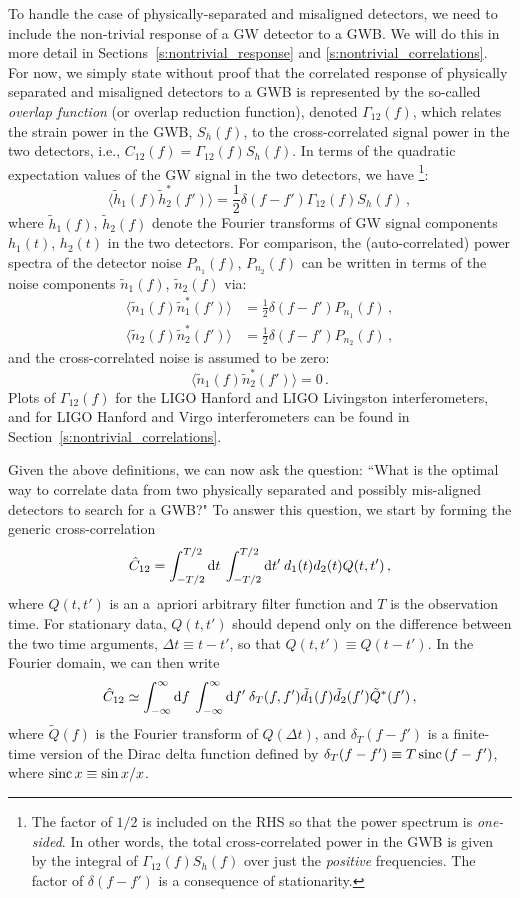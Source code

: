 \documentclass[11pt]{article}
\numberwithin{equation}{section}
\def\be{\begin{equation}}
\def\ee{\end{equation}}
\def\D{{\rm d}}
\begin{document}
To handle the case of physically-separated and misaligned 
detectors, we need to include the non-trivial response of 
a GW detector to a GWB.  
We will do this in more detail in 
Sections~\ref{s:nontrivial_response} and
\ref{s:nontrivial_correlations}.
For now, we simply state without proof that the 
correlated response of physically separated and misaligned 
detectors to a GWB is represented by the so-called 
{\em overlap function} (or overlap reduction function),
denoted $\Gamma_{12}(f)$, 
which relates the strain power in the
GWB, $S_h(f)$, to the cross-correlated signal power 
in the two detectors, i.e., $C_{12}(f) = \Gamma_{12}(f) S_h(f)$.
In terms of the quadratic expectation values of the GW 
signal in the two detectors, we have%
\footnote{The factor of $1/2$ is included on the RHS
so that the power spectrum is {\em one-sided}.
In other words, 
the total cross-correlated power in the GWB is
given by the integral of $\Gamma_{12}(f)S_h(f)$ over just
the {\em positive} frequencies.
The factor of $\delta(f-f')$ is a consequence of stationarity.}:
%
\be
\langle \tilde h_1(f) \tilde h_2^*(f')\rangle
=\frac{1}{2}\delta(f-f')\Gamma_{12}(f)S_h(f)\,,
\ee
%
where $\tilde h_1(f)$, $\tilde h_2(f)$ denote the 
Fourier transforms of GW signal components 
$h_1(t)$, $h_2(t)$ in  the two detectors.
For comparison, the (auto-correlated) power spectra 
of the detector noise $P_{n_1}(f)$, $P_{n_2}(f)$ 
can be written in terms of the noise components 
$\tilde n_1(f)$, $\tilde n_2(f)$ via:
%
\be
\begin{aligned}
\label{e:noise_power_spectra}
\langle \tilde n_1(f) \tilde n_1^*(f')\rangle
&=\frac{1}{2}\delta(f-f')P_{n_1}(f)\,,
\\
\langle \tilde n_2(f) \tilde n_2^*(f')\rangle
&=\frac{1}{2}\delta(f-f')P_{n_2}(f)\,,
\end{aligned}
\ee
%
and the cross-correlated noise is assumed to be zero:
%
\be
\langle \tilde n_1(f) \tilde n_2^*(f')\rangle =0\,.
\ee
Plots of $\Gamma_{12}(f)$ for the LIGO Hanford and 
LIGO Livingston interferometers, and for LIGO Hanford
and Virgo interferometers can be found in 
Section~\ref{s:nontrivial_correlations}.

Given the above definitions, we can now ask
the question: ``What is the optimal way to correlate 
data from two physically separated and possibly 
mis-aligned detectors to search for a GWB?"
To answer this question, we start by forming the 
generic cross-correlation
%
\be
\hat C_{12} = \int_{-T/2}^{T/2}\D t\>\int_{-T/2}^{T/2}\D t'\>
d_1(t)d_2(t) Q(t,t')\,,
\ee
%
where $Q(t,t')$ is an a~apriori arbitrary filter 
function and $T$ is the observation time.
For stationary data, $Q(t,t')$ should depend only on
the difference between the two time arguments, 
$\Delta t\equiv t-t'$, 
so that $Q(t,t')\equiv Q(t-t')$.
In the Fourier domain, we can then write
%
\be
\hat C_{12} \simeq 
\int_{-\infty}^{\infty}\D f\>\int_{-\infty}^{\infty}\D f'\>
\delta_T(f,f')\tilde d_1(f)\tilde d_2(f') \tilde Q^*(f')\,,
\ee
%
where $\tilde Q(f)$ is the Fourier transform of 
$Q(\Delta t)$, and $\delta_T(f-f')$ is a finite-time
version of the Dirac delta function defined by 
$\delta_T(f-f')\equiv T\,{\rm sinc}\,(f-f')$, where
${\rm sinc}\,x \equiv \sin x/x$.
\end{document}
